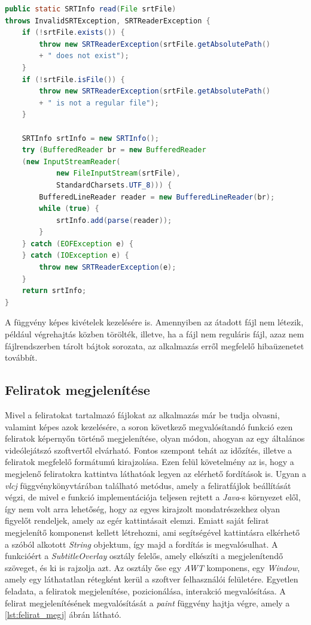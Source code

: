 \begin{spacing}{1.25}
\begin{lstlisting}[caption=Srt fájlok feldolgozása, label={lst:srt_feldolgozas}, language=java,  showstringspaces=false]
public static SRTInfo read(File srtFile) 
throws InvalidSRTException, SRTReaderException {
    if (!srtFile.exists()) {
        throw new SRTReaderException(srtFile.getAbsolutePath()
        + " does not exist");
    }
    if (!srtFile.isFile()) {
        throw new SRTReaderException(srtFile.getAbsolutePath()
        + " is not a regular file");
    }

    SRTInfo srtInfo = new SRTInfo();
    try (BufferedReader br = new BufferedReader
    (new InputStreamReader(
            new FileInputStream(srtFile),
            StandardCharsets.UTF_8))) {
        BufferedLineReader reader = new BufferedLineReader(br);
        while (true) {
            srtInfo.add(parse(reader));
        }
    } catch (EOFException e) {
    } catch (IOException e) {
        throw new SRTReaderException(e);
    }
    return srtInfo;
}
\end{lstlisting}
\end{spacing}

  A függvény képes kivételek kezelésére is. Amennyiben az átadott fájl nem létezik, például végrehajtás közben törölték, illetve, ha a fájl nem reguláris fájl, azaz nem fájlrendszerben tárolt bájtok sorozata, az alkalmazás erről megfelelő hibaüzenetet továbbít.
  
\subsection{Feliratok megjelenítése}
Mivel a feliratokat tartalmazó fájlokat az alkalmazás már be tudja olvasni, valamint képes azok kezelésére, a soron következő megvalósítandó funkció ezen feliratok képernyőn történő megjelenítése, olyan módon, ahogyan az egy általános videólejátszó szoftvertől elvárható. Fontos szempont tehát az időzítés, illetve a feliratok megfelelő formátumú kirajzolása. Ezen felül követelmény az is, hogy a megjelenő feliratokra kattintva láthatóak legyen az elérhető fordítások is. Ugyan a \textit{vlcj} függvénykönyvtárában található metódus, amely a feliratfájlok beállítását végzi, de mivel e funkció implementációja teljesen rejtett a \textit{Java}-s környezet elől, így nem volt arra lehetőség, hogy az egyes kirajzolt mondatrészekhez olyan figyelőt rendeljek, amely az egér kattintásait elemzi. Emiatt saját felirat megjelenítő komponenst kellett létrehozni, ami segítségével kattintásra elkérhető a szóból alkotott \textit{String} objektum, így majd a fordítás is megvalósulhat. A funkcióért a \textit{SubtitleOverlay} osztály felelős, amely elkészíti a megjelenítendő szöveget, és ki is rajzolja azt. Az osztály őse egy \textit{AWT} komponens, egy \textit{Window}, amely egy láthatatlan rétegként kerül a szoftver felhasználói felületére. Egyetlen feladata, a feliratok megjelenítése, pozicionálása, interakció megvalósítása. A felirat megjelenítésének megvalósítását a \textit{paint} függvény hajtja végre, amely a \ref{lst:felirat_megj} ábrán látható.

